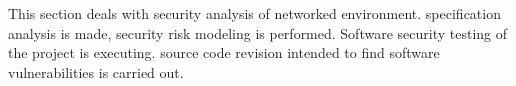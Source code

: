 %
%
This section deals with security analysis of  networked environment. 
%
 specification analysis is made,  security risk modeling is performed. 
%
Software security testing of the project is executing. 
%
 source code revision intended to find software vulnerabilities is carried out. 